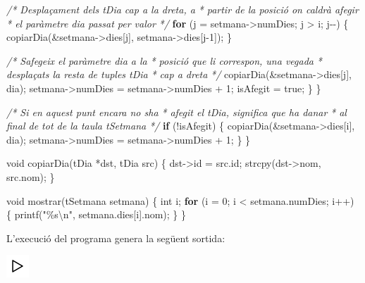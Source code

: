 \documentclass[
]{book}
\newenvironment{Shaded}{\begin{snugshade}}{\end{snugshade}}
\newcommand{\CommentTok}[1]{\textcolor[rgb]{0.56,0.35,0.01}{\textit{#1}}}
\newcommand{\ControlFlowTok}[1]{\textcolor[rgb]{0.13,0.29,0.53}{\textbf{#1}}}
\newcommand{\DataTypeTok}[1]{\textcolor[rgb]{0.13,0.29,0.53}{#1}}
\newcommand{\DecValTok}[1]{\textcolor[rgb]{0.00,0.00,0.81}{#1}}
\newcommand{\NormalTok}[1]{#1}
\newcommand{\SpecialCharTok}[1]{\textcolor[rgb]{0.00,0.00,0.00}{#1}}
\newcommand{\StringTok}[1]{\textcolor[rgb]{0.31,0.60,0.02}{#1}}
\begin{document}
\begin{Shaded}
\begin{Highlighting}[]
            \CommentTok{/* Desplaçament dels tDia cap a la dreta, a}
\CommentTok{             * partir de la posició on caldrà afegir }
\CommentTok{             * el paràmetre dia passat per valor }
\CommentTok{             */}
            \ControlFlowTok{for}\NormalTok{ (j = setmana{-}\textgreater{}numDies; j \textgreater{} i; j{-}{-}) \{}
\NormalTok{                copiarDia(\&setmana{-}\textgreater{}dies[j], setmana{-}\textgreater{}dies[j{-}}\DecValTok{1}\NormalTok{]);    }
\NormalTok{            \}}
            
            \CommentTok{/* S\textquotesingle{}afegeix el paràmetre dia a la }
\CommentTok{             * posició que li correspon, una vegada}
\CommentTok{             * desplaçats la resta de tuples tDia }
\CommentTok{             * cap a dreta }
\CommentTok{             */}
\NormalTok{            copiarDia(\&setmana{-}\textgreater{}dies[j], dia);}
\NormalTok{            setmana{-}\textgreater{}numDies = setmana{-}\textgreater{}numDies + }\DecValTok{1}\NormalTok{;}
\NormalTok{            isAfegit = true;}
\NormalTok{        \}}
\NormalTok{    \}}

    \CommentTok{/* Si en aquest punt encara no s\textquotesingle{}ha }
\CommentTok{     * afegit el tDia, significa que ha d\textquotesingle{}anar}
\CommentTok{     * al final de tot de la taula tSetmana }
\CommentTok{     */}
    \ControlFlowTok{if}\NormalTok{ (!isAfegit) \{}
\NormalTok{        copiarDia(\&setmana{-}\textgreater{}dies[i], dia);}
\NormalTok{        setmana{-}\textgreater{}numDies = setmana{-}\textgreater{}numDies + }\DecValTok{1}\NormalTok{;}
\NormalTok{    \}}
\NormalTok{\}}

\DataTypeTok{void}\NormalTok{ copiarDia(tDia *dst, tDia src) \{    }
\NormalTok{    dst{-}\textgreater{}id = src.id; }
\NormalTok{    strcpy(dst{-}\textgreater{}nom, src.nom);}
\NormalTok{\}}

\DataTypeTok{void}\NormalTok{ mostrar(tSetmana setmana) \{}
    \DataTypeTok{int}\NormalTok{ i;}
    \ControlFlowTok{for}\NormalTok{ (i = }\DecValTok{0}\NormalTok{; i \textless{} setmana.numDies; i++) \{}
\NormalTok{        printf(}\StringTok{"\%s}\SpecialCharTok{\textbackslash{}n}\StringTok{"}\NormalTok{, setmana.dies[i].nom);}
\NormalTok{    \}}
\NormalTok{\}}
\end{Highlighting}
\end{Shaded}

L'execució del programa genera la següent sortida:

\includegraphics{./img/play.png}
\end{document}
